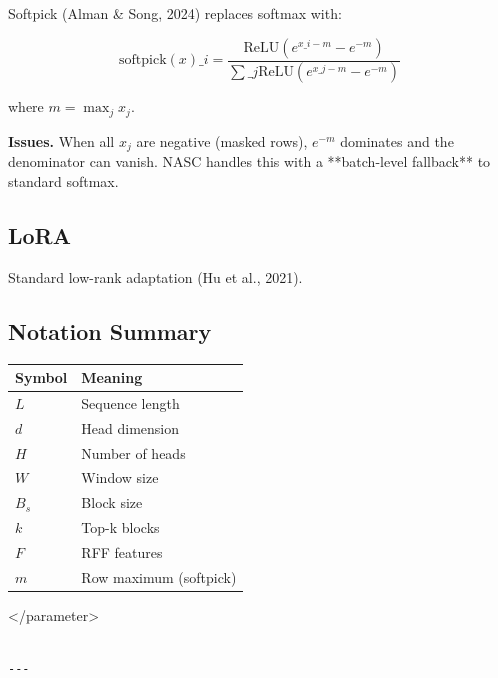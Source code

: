 Softpick (Alman \& Song, 2024) replaces softmax with:

\[
\text{softpick}(x)\_i = \frac{\text{ReLU}(e^{x\_i - m} - e^{-m})}{\sum\_j \text{ReLU}(e^{x\_j - m} - e^{-m})}
\tag{3.6}
\]

where $m = \max_j x_j$.

\textbf{Issues.} When all $x_j$ are negative (masked rows), $e^{-m}$ dominates 
and the denominator can vanish. NASC handles this with a **batch-level 
fallback** to standard softmax.

\subsection{LoRA}

Standard low-rank adaptation (Hu et al., 2021).

\subsection{Notation Summary}

\begin{table}[H]
\centering
\small
\begin{tabular}{ll}
\toprule
\textbf{Symbol} & \textbf{Meaning} \\
\midrule
$L$ & Sequence length \\
$d$ & Head dimension \\
$H$ & Number of heads \\
$W$ & Window size \\
$B_s$ & Block size \\
$k$ & Top-k blocks \\
$F$ & RFF features \\
$m$ & Row maximum (softpick) \\
\bottomrule
\end{tabular}
\end{table}
\textless{}/parameter\textgreater{}
\begin{lstlisting}

---
\end{lstlisting}
